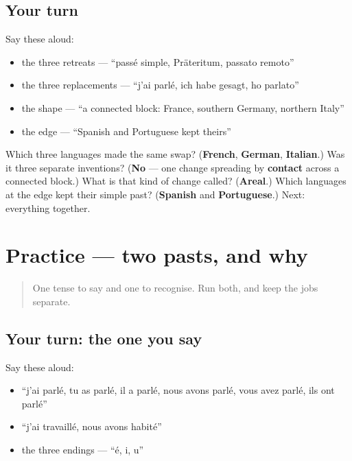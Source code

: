 \subsection*{Your turn}
Say these aloud:

\begin{itemize}
\raggedright
  \item the three retreats — \textquotedblleft{}passé simple, Präteritum, passato remoto\textquotedblright{}
  \item the three replacements — \textquotedblleft{}j'ai parlé, ich habe gesagt, ho parlato\textquotedblright{}
  \item the shape — \textquotedblleft{}a connected block: France, southern Germany, northern Italy\textquotedblright{}
  \item the edge — \textquotedblleft{}Spanish and Portuguese kept theirs\textquotedblright{}
\end{itemize}

\begin{tcolorbox}[breakable,colback=teal!4,colframe=teal!35!black,title={Before you move on}]
Which three languages made the same swap? (\textbf{French}, \textbf{German}, \textbf{Italian}.) Was it three separate inventions? (\textbf{No} — one change spreading by \textbf{contact} across a connected block.) What is that kind of change called? (\textbf{Areal}.) Which languages at the edge kept their simple past? (\textbf{Spanish} and \textbf{Portuguese}.) Next: everything together.
\end{tcolorbox}
\section[Practice]{Practice — two pasts, and why}

\label{lesson:FR-C15-practice}



\begin{quote}
One tense to say and one to recognise. Run both, and keep the jobs separate.
\end{quote}

\subsection*{Your turn: the one you say}
Say these aloud:

\begin{itemize}
\raggedright
  \item \textquotedblleft{}j'ai parlé, tu as parlé, il a parlé, nous avons parlé, vous avez parlé, ils ont parlé\textquotedblright{}
  \item \textquotedblleft{}j'ai travaillé, nous avons habité\textquotedblright{}
  \item the three endings — \textquotedblleft{}é, i, u\textquotedblright{}
\end{itemize}

